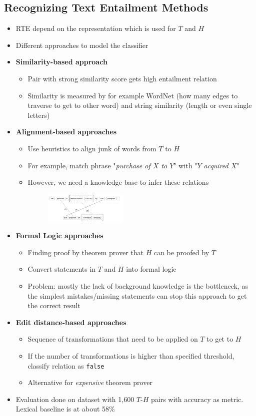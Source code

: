 \subsection{Recognizing Text Entailment Methods}
\begin{itemize}
	\item RTE depend on the representation which is used for $T$ and $H$
	\item Different approaches to model the classifier
	\item \textbf{Similarity-based approach}
	\begin{itemize}
		\item Pair with strong similarity score gets high entailment relation
		\item Similarity is measured by for example WordNet (how many edges to traverse to get to other word) and string similarity (length or even single letters)
	\end{itemize}
	\item \textbf{Alignment-based approaches}
	\begin{itemize}
		\item Use heuristics to align junk of words from $T$ to $H$
		\item For example, match phrase "\textit{purchase of $X$ to $Y$}" with "\textit{$Y$ acquired $X$}"
		\item However, we need a knowledge base to infer these relations
		\begin{figure}[ht]
			\centering
			\includegraphics[width=0.4\textwidth]{figures/text_entailment_alginment_based_methods.png}
		\end{figure}
	\end{itemize}
	\item \textbf{Formal Logic approaches}
	\begin{itemize}
		\item Finding proof by theorem prover that $H$ can be proofed by $T$ 
		\item Convert statements in $T$ and $H$ into formal logic
		\item Problem: mostly the lack of background knowledge is the bottleneck, as the simplest mistakes/missing statements can stop this approach to get the correct result
	\end{itemize}
	\item \textbf{Edit distance-based approaches}
	\begin{itemize}
		\item Sequence of transformations that need to be applied on $T$ to get to $H$
		\item If the number of transformations is higher than specified threshold, classify relation as \texttt{false}
		\item Alternative for \textit{expensive} theorem prover
	\end{itemize}
	\item Evaluation done on dataset with 1,600 $T$-$H$ pairs with accuracy as metric. Lexical baseline is at about 58\%
\end{itemize}
